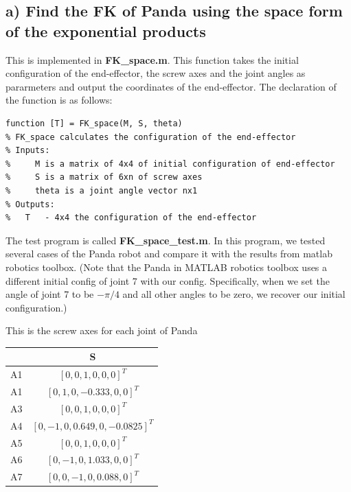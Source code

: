\documentclass[english,10pt,a4paper]{article}
\begin{document}
    \subsection*{a) Find the FK of Panda using the space form of the exponential products}
	This is implemented in \textbf{FK\_space.m}. This function takes the initial configuration of the end-effector, the screw axes and the joint angles as pararmeters and output the coordinates of the end-effector. The declaration of the function is as follows:
    \begin{lstlisting}[style=matlab]
function [T] = FK_space(M, S, theta)
% FK_space calculates the configuration of the end-effector
% Inputs:
%     M is a matrix of 4x4 of initial configuration of end-effector
%     S is a matrix of 6xn of screw axes
%     theta is a joint angle vector nx1
% Outputs:
%   T   - 4x4 the configuration of the end-effector
    \end{lstlisting}
	
    The test program is called \textbf{FK\_space\_test.m}. In this program, we tested several cases of the Panda robot and compare it with the results from matlab robotics toolbox. (Note that the Panda in MATLAB robotics toolbox uses a different initial config of joint 7 with our config. Specifically, when we set the angle of joint 7 to be $-\pi/4$ and all other angles to be zero, we recover our initial configuration.)
	
    This is the screw axes for each joint of Panda
    \begin{center}
        \begin{tabular}{|c|c|}
            \hline
            &  S \\
            \hline
            A1 & $[0, 0, 1, 0, 0, 0]^{T}$ \\
            \hline
            A1 & $[0, 1, 0, -0.333, 0, 0]^{T}$ \\
            \hline
            A3 & $[0, 0, 1, 0, 0, 0]^{T}$ \\
            \hline
            A4 & $[0, -1, 0, 0.649, 0, -0.0825]^{T}$ \\
            \hline
            A5 & $[0, 0, 1, 0, 0, 0]^{T}$  \\
            \hline
            A6 & $[0, -1, 0, 1.033, 0, 0]^{T}$  \\
            \hline
            A7 & $[0, 0, -1, 0, 0.088, 0]^{T}$ \\
            \hline
        \end{tabular}
    \end{center}
\end{document}
